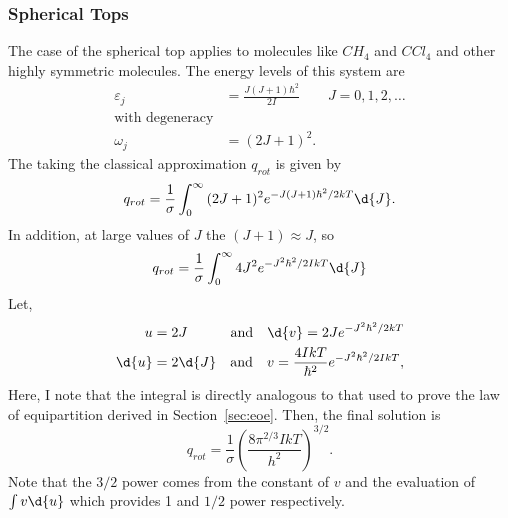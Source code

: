 \subsubsection{Spherical Tops}
The case of the spherical top applies to molecules like $CH_4$ and $CCl_4$ and
other highly symmetric molecules. The energy levels of this system are
\begin{align*}
	\varepsilon_j &= \frac{J(J+1)\hbar^2}{2I} \qquad J = 0,1,2,\ldots\\
	\text{with degeneracy}\\
	\omega_j &= (2J + 1)^2.
\end{align*}
The taking the classical approximation $q_{rot}$ is given by
\begin{equation*}
	q_{rot} = \frac{1}{\sigma}
	\int_{0}^{\infty}{(2J + 1)^2 e^{-J(J+1)\hbar^{2}/2kT}\d{J}}.
\end{equation*}
In addition, at large values of $J$ the $(J + 1) \approx J$, so
\begin{equation*}
	q_{rot} = \frac{1}{\sigma}
	\int_{0}^{\infty}{4J^2 e^{-J^2 \hbar^{2}/2IkT}\d{J}}\\
\end{equation*}
Let,
\begin{align*}
	u &= 2J &\text{and} \quad
	\d{v} = 2J e^{-J^2 \hbar^{2}/2kT}\\
	\d{u} &= 2 \d{J}  &\text{and} \quad
	v = \frac{4IkT}{\hbar^2} e^{-J^2 \hbar^{2}/2IkT},
\end{align*}
Here, I note that the integral is directly analogous to that used to prove the
law of equipartition derived in Section~\ref{sec:eoe}. Then, the final solution
is
\begin{equation*}
	q_{rot} = \frac{1}{\sigma}
	{\left( \frac{8\pi^{2/3} IkT}{h^2} \right)}^{3/2}.
\end{equation*}
Note that the $3/2$ power comes from the constant of $v$ and the
evaluation of $\int{v \d{u}}$ which provides 1 and $1/2$ power
respectively.

